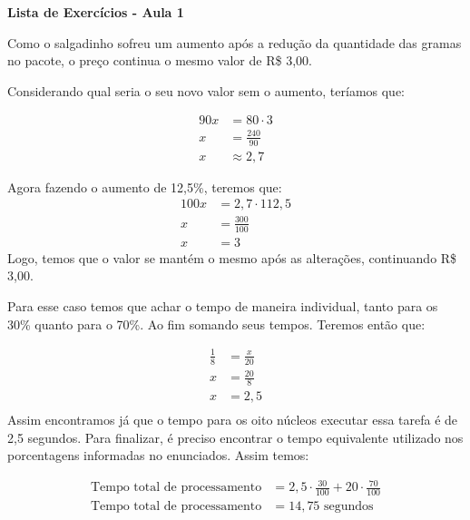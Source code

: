 \documentclass{scrartcl} %
\begin{document}
\begin{center}
\textbf{Lista de Exercícios - Aula 1}
\end{center}

\begin{multicols}{2}

\setlength\columnseprule{1pt}
\def\columnseprulecolor{\color{corlinha}}%

\begin{question}
Como o salgadinho sofreu um aumento após a redução da quantidade das gramas no pacote, o preço continua o mesmo valor de R\$ 3,00.

Considerando qual seria o seu novo valor sem o aumento, teríamos que:

\begin{align*}
90x &= 80 \cdot 3   \\
x &= \frac{240}{90} \\
x &\approx 2,7
 \end{align*}
 
Agora fazendo o aumento de 12,5\%, teremos que:
\begin{align*}
   100x &= 2,7 \cdot 112,5\\
   x &= \frac{300}{100} \\
   x &= 3
\end{align*}
Logo, temos que o valor se mantém o mesmo após as alterações, continuando R\$ 3,00.
\end{question}


\begin{question}
Para esse caso temos que achar o tempo de maneira individual, tanto para os 30\% quanto para o 70\%. Ao fim somando seus tempos. Teremos então que:

\begin{align*}
\frac{1}{8}&= \frac{x}{20} \\
x&= \frac{20}{8} \\
x &= 2,5\\
 \end{align*}
Assim encontramos já que o tempo para os oito núcleos executar essa tarefa é de 2,5 segundos. Para finalizar, é preciso encontrar o tempo equivalente utilizado nos porcentagens informadas no enunciados. Assim temos:

\begin{align*}
\textrm{Tempo total de processamento} &= 2,5 \cdot \frac{30}{100} + 20 \cdot \frac{70}{100}\\
\textrm{Tempo total de processamento} &= 14,75 \textrm{ segundos}\\
 \end{align*}
 

\end{question}
\end{multicols}
\end{document}
